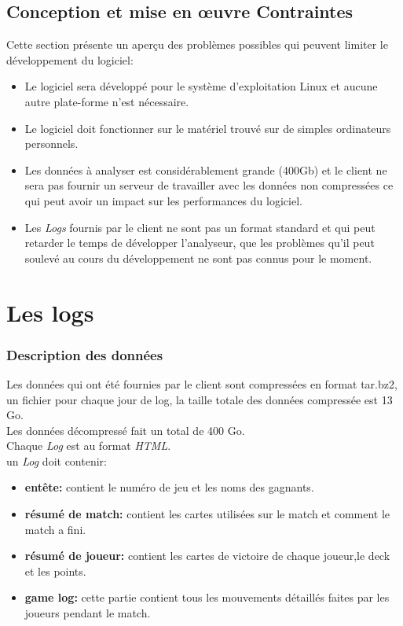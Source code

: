 \documentclass{scrreprt}
\begin{document}
\section{Conception et mise en œuvre Contraintes}
Cette section présente un aperçu des problèmes possibles qui peuvent limiter le développement du logiciel:
\begin{itemize}
\item Le logiciel sera développé pour le système d'exploitation Linux et aucune autre plate-forme n’est nécessaire.
\item Le logiciel doit fonctionner sur le matériel trouvé sur de simples ordinateurs personnels.
\item Les données à analyser est considérablement grande (400Gb) et le client ne sera pas fournir un serveur de travailler avec les données non compressées ce qui peut avoir un impact sur les performances du logiciel.

\item Les \textit{Logs} fournis par le client ne sont pas un format standard et qui peut retarder le temps de développer l'analyseur, que les problèmes qu'il peut soulevé au cours du développement ne sont pas connus pour le moment.
\end{itemize}

\chapter{Les logs}
\subsection{Description des données}
Les données qui ont été fournies par le client sont compressées en format tar.bz2, un fichier pour chaque jour de log, la taille totale des données compressée est 13 Go.\\
Les données décompressé fait un total de 400 Go.\\
Chaque \textit{Log} est au format \textit{HTML}.\\
un \textit{Log} doit contenir:
\begin{itemize}
  \item{\textbf{entête:}} contient le numéro de jeu et les noms des gagnants.
  \item{\textbf{résumé de  match:}} contient les cartes utilisées sur le match et comment le match a fini.
  \item{\textbf{résumé de joueur:}} contient  les cartes de victoire de chaque joueur,le deck et les points.
  \item{\textbf{game log:}} cette partie contient tous les mouvements détaillés faites par les joueurs pendant le match.

\end{itemize}
\end{document}
